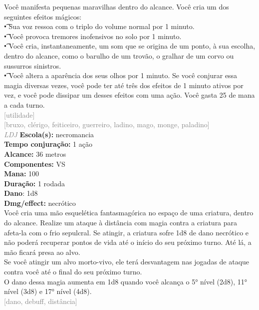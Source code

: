 \documentclass{RPG_Adventure}[2021/10/20]
\begin{document}
{\normalsize Você manifesta pequenas maravilhas dentro do alcance. Você cria um dos seguintes efeitos mágicos:\\\t • Sua voz ressoa com o triplo do volume normal por 1 minuto.\\\t • Você provoca tremores inofensivos no solo por 1 minuto.\\\t • Você cria, instantaneamente, um som que se origina de um ponto, à sua escolha, dentro do alcance, como o barulho de um trovão, o gralhar de um corvo ou sussurros sinistros.\\\t • Você altera a aparência dos seus olhos por 1 minuto.  Se você conjurar essa magia diversas vezes, você pode ter até três dos efeitos de 1 minuto ativos por vez, e você pode dissipar um desses efeitos com uma ação. Você gasta 25 de mana a cada turno.\\}
{\scriptsize \textcolor{gray}{[utilidade]\\}}
{\scriptsize \textcolor{gray}{[bruxo, clérigo, feiticeiro, guerreiro, ladino, mago, monge, paladino]\\}}
{\tiny \textcolor{gray}{\textit{LDJ}}}
{\small \t \textbf{Escola(s):} necromancia\\\t \textbf{Tempo conjuração:} 1 ação\\\t \textbf{Alcance:} 36 metros\\\t \textbf{Componentes:} VS\\\t \textbf{Mana:} 100\\\t \textbf{Duração:} 1 rodada\\\t \textbf{Dano}: 1d8\\\t \textbf{Dmg/effect:} necrótico\\}
{\normalsize Você cria uma mão esquelética fantasmagórica no espaço de uma criatura, dentro do alcance. Realize um ataque à distância com magia contra a criatura para afeta-la com o frio sepulcral. Se atingir, a criatura sofre 1d8 de dano necrótico e não poderá recuperar pontos de vida até o início do seu próximo turno. Até lá, a mão ficará presa ao alvo.\\Se você atingir um alvo morto-vivo, ele terá desvantagem nas jogadas de ataque contra você até o final do seu próximo turno.\\O dano dessa magia aumenta em 1d8 quando você alcança o 5° nível (2d8), 11° nível (3d8) e 17° nível (4d8).\\}
{\scriptsize \textcolor{gray}{[dano, debuff, distância]\\}}
\end{document}
